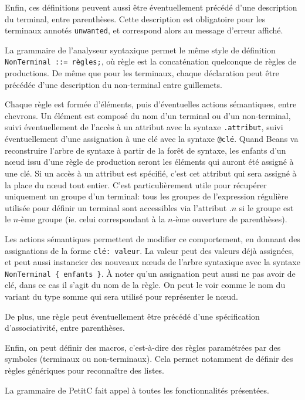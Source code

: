 \documentclass{scrartcl}
\begin{document}
Enfin, ces définitions peuvent aussi être éventuellement précédé
d'une description du terminal, entre parenthèses. Cette description
est obligatoire pour les terminaux annotés \verb|unwanted|, et
correspond alors au message d'erreur affiché.\par
La grammaire de l'analyseur syntaxique permet le même style de
définition\\
\verb|NonTerminal ::= règles;|, où règle est la concaténation
quelconque de règles de productions. De même que pour les terminaux,
chaque déclaration peut être précédée d'une description du non-terminal
entre guillemets.\par
Chaque règle est formée d'éléments, puis d'éventuelles actions sémantiques,
entre chevrons. Un élément est composé du nom d'un terminal ou d'un
non-terminal, suivi éventuellement de l'accès à un attribut avec la
syntaxe \verb|.attribut|, suivi éventuellement d'une assignation à une
clé avec la syntaxe \verb|@clé|. Quand Beans va reconstruire l'arbre
de syntaxe à partir de la forêt de syntaxe, les enfants d'un n\oe{}ud issu
d'une règle de production seront les éléments qui auront été assigné
à une clé. Si un accès à un attribut est spécifié, c'est cet attribut
qui sera assigné à la place du n\oe{}ud tout entier. C'est particulièrement
utile pour récupérer uniquement un groupe d'un terminal: tous les groupes
de l'expression régulière utilisée pour définir un terminal sont
accessibles via l'attribut \(.n\) si le groupe est le \(n\)-ème groupe
(ie. celui correspondant à la \(n\)-ème ouverture de parenthèses).\par
Les actions sémantiques permettent de modifier ce comportement, en
donnant des assignations de la forme \verb|clé: valeur|. La valeur
peut des valeurs déjà assignées, et peut aussi instancier des nouveaux
n\oe{}uds de l'arbre syntaxique avec la syntaxe\\
\verb|NonTerminal { enfants }|. À noter qu'un assignation peut aussi
ne pas avoir de clé, dans ce cas il s'agit du nom de la règle. On
peut le voir comme le nom du variant du type somme qui sera utilisé
pour représenter le n\oe{}ud.\par
De plus, une règle peut éventuellement être précédé d'une spécification
d'associativité, entre parenthèses.\par
Enfin, on peut définir des macros, c'est-à-dire des règles paramétrées
par des symboles (terminaux ou non-terminaux). Cela permet notamment
de définir des règles génériques pour reconnaître des listes.\par
La grammaire de PetitC fait appel à toutes les fonctionnalités
présentées.
\end{document}
